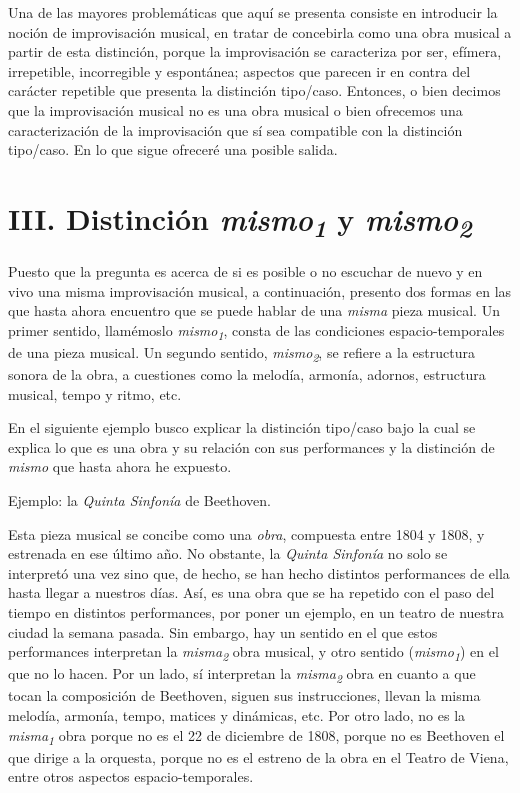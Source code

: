 \documentclass[]{book}
\begin{document}
Una de las mayores problemáticas que aquí se presenta consiste en
introducir la noción de improvisación musical, en tratar de concebirla
como una obra musical a partir de esta distinción, porque la
improvisación se caracteriza por ser, efímera, irrepetible, incorregible
y espontánea; aspectos que parecen ir en contra del carácter repetible
que presenta la distinción tipo/caso. Entonces, o bien decimos que la
improvisación musical no es una obra musical o bien ofrecemos una
caracterización de la improvisación que sí sea compatible con la
distinción tipo/caso. En lo que sigue ofreceré una posible salida.

\section*{III. Distinción \emph{mismo\textsubscript{1}} y
  \emph{mismo\textsubscript{2}}}


Puesto que la pregunta es acerca de si es posible o no escuchar de nuevo
y en vivo una misma improvisación musical, a continuación, presento dos
formas en las que hasta ahora encuentro que se puede hablar de una
\emph{misma} pieza musical. Un primer sentido, llamémoslo
\emph{mismo\textsubscript{1}}, consta de las condiciones
espacio-temporales de una pieza musical. Un segundo sentido,
\emph{mismo\textsubscript{2}}, se refiere a la estructura sonora de la
obra, a cuestiones como la melodía, armonía, adornos, estructura
musical, tempo y ritmo, etc.

En el siguiente ejemplo busco explicar la distinción tipo/caso bajo la
cual se explica lo que es una obra y su relación con sus performances y
la distinción de \emph{mismo} que hasta ahora he expuesto.

Ejemplo: la \emph{Quinta Sinfonía} de Beethoven.

Esta pieza musical se concibe como una \emph{obra}, compuesta entre 1804
y 1808, y estrenada en ese último año. No obstante, la \emph{Quinta
Sinfonía} no solo se interpretó una vez sino que, de hecho, se han hecho
distintos performances de ella hasta llegar a nuestros días. Así, es una
obra que se ha repetido con el paso del tiempo en distintos
performances, por poner un ejemplo, en un teatro de nuestra ciudad la
semana pasada. Sin embargo, hay un sentido en el que estos performances
interpretan la \emph{misma\textsubscript{2}} obra musical, y otro
sentido (\emph{mismo\textsubscript{1}}) en el que no lo hacen. Por un
lado, sí interpretan la \emph{misma\textsubscript{2}} obra en cuanto a
que tocan la composición de Beethoven, siguen sus instrucciones, llevan
la misma melodía, armonía, tempo, matices y dinámicas, etc. Por otro
lado, no es la \emph{misma\textsubscript{1}} obra porque no es el 22 de
diciembre de 1808, porque no es Beethoven el que dirige a la orquesta,
porque no es el estreno de la obra en el Teatro de Viena, entre otros
aspectos espacio-temporales.
\end{document}
